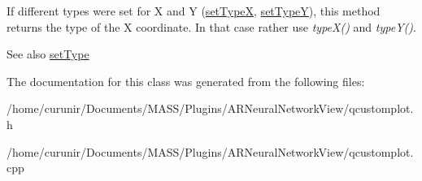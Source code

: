 If different types were set for X and Y (\hyperlink{class_q_c_p_item_position_a2113b2351d6d00457fb3559a4e20c3ea}{set\+TypeX}, \hyperlink{class_q_c_p_item_position_ac2a454aa5a54c1615c50686601ec4510}{set\+TypeY}), this method returns the type of the X coordinate. In that case rather use {\itshape type\+X()} and {\itshape type\+Y()}.

\begin{DoxySeeAlso}{See also}
\hyperlink{class_q_c_p_item_position_aa476abf71ed8fa4c537457ebb1a754ad}{set\+Type} 
\end{DoxySeeAlso}


The documentation for this class was generated from the following files\+:\begin{DoxyCompactItemize}
\item 
/home/curunir/\+Documents/\+M\+A\+S\+S/\+Plugins/\+A\+R\+Neural\+Network\+View/qcustomplot.\+h\item 
/home/curunir/\+Documents/\+M\+A\+S\+S/\+Plugins/\+A\+R\+Neural\+Network\+View/qcustomplot.\+cpp\end{DoxyCompactItemize}
